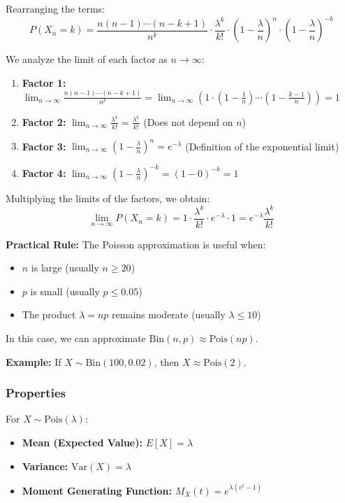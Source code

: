 \documentclass[12pt]{article}
\begin{document}
Rearranging the terms:
$$P(X_n = k) = \frac{n(n-1)\cdots(n-k+1)}{n^k} \cdot \frac{\lambda^k}{k!} \cdot \left(1 - \frac{\lambda}{n}\right)^n \cdot \left(1 - \frac{\lambda}{n}\right)^{-k}$$

We analyze the limit of each factor as $n \to \infty$:
\begin{enumerate}
    \item \textbf{Factor 1:} $\displaystyle \lim_{n \to \infty} \frac{n(n-1)\cdots(n-k+1)}{n^k} = \lim_{n \to \infty} \left(1 \cdot \left(1-\frac{1}{n}\right) \cdots \left(1-\frac{k-1}{n}\right)\right) = 1$
    \item \textbf{Factor 2:} $\displaystyle \lim_{n \to \infty} \frac{\lambda^k}{k!} = \frac{\lambda^k}{k!}$ (Does not depend on $n$)
    \item \textbf{Factor 3:} $\displaystyle \lim_{n \to \infty} \left(1 - \frac{\lambda}{n}\right)^n = e^{-\lambda}$ (Definition of the exponential limit)
    \item \textbf{Factor 4:} $\displaystyle \lim_{n \to \infty} \left(1 - \frac{\lambda}{n}\right)^{-k} = (1 - 0)^{-k} = 1$
\end{enumerate}

Multiplying the limits of the factors, we obtain:
$$\lim_{n \to \infty} P(X_n = k) = 1 \cdot \frac{\lambda^k}{k!} \cdot e^{-\lambda} \cdot 1 = e^{-\lambda} \frac{\lambda^k}{k!}$$

\textbf{Practical Rule:} The Poisson approximation is useful when:
\begin{itemize}
    \item $n$ is large (usually $n \geq 20$)
    \item $p$ is small (usually $p \leq 0.05$)
    \item The product $\lambda = np$ remains moderate (usually $\lambda \leq 10$)
\end{itemize}

In this case, we can approximate $\text{Bin}(n, p) \approx \text{Pois}(np)$.

\textbf{Example:} If $X \sim \text{Bin}(100, 0.02)$, then $X \approx \text{Pois}(2)$.

\subsubsection{Properties}

For $X \sim \text{Pois}(\lambda)$:
\begin{itemize}
    \item \textbf{Mean (Expected Value):} $E[X] = \lambda$
    \item \textbf{Variance:} $\text{Var}(X) = \lambda$
    \item \textbf{Moment Generating Function:} $M_X(t) = e^{\lambda(e^t - 1)}$
\end{itemize}
\end{document}
